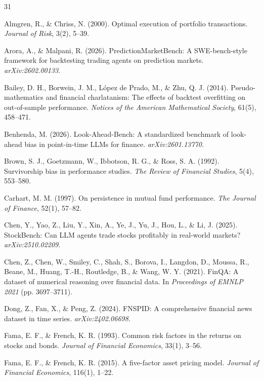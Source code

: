 \documentclass{article}
\begin{document}
\begin{thebibliography}{31}

 Almgren, R., \& Chriss, N. (2000). Optimal execution of portfolio transactions. \textit{Journal of Risk}, 3(2), 5--39.

 Arora, A., \& Malpani, R. (2026). PredictionMarketBench: A SWE-bench-style framework for backtesting trading agents on prediction markets. \textit{arXiv:2602.00133}.

 Bailey, D. H., Borwein, J. M., L\'{o}pez de Prado, M., \& Zhu, Q. J. (2014). Pseudo-mathematics and financial charlatanism: The effects of backtest overfitting on out-of-sample performance. \textit{Notices of the American Mathematical Society}, 61(5), 458--471.

 Benhenda, M. (2026). Look-Ahead-Bench: A standardized benchmark of look-ahead bias in point-in-time LLMs for finance. \textit{arXiv:2601.13770}.

 Brown, S. J., Goetzmann, W., Ibbotson, R. G., \& Ross, S. A. (1992). Survivorship bias in performance studies. \textit{The Review of Financial Studies}, 5(4), 553--580.

 Carhart, M. M. (1997). On persistence in mutual fund performance. \textit{The Journal of Finance}, 52(1), 57--82.

 Chen, Y., Yao, Z., Liu, Y., Xin, A., Ye, J., Yu, J., Hou, L., \& Li, J. (2025). StockBench: Can LLM agents trade stocks profitably in real-world markets? \textit{arXiv:2510.02209}.

 Chen, Z., Chen, W., Smiley, C., Shah, S., Borova, I., Langdon, D., Moussa, R., Beane, M., Huang, T.-H., Routledge, B., \& Wang, W. Y. (2021). FinQA: A dataset of numerical reasoning over financial data. In \textit{Proceedings of EMNLP 2021} (pp. 3697--3711).

 Dong, Z., Fan, X., \& Peng, Z. (2024). FNSPID: A comprehensive financial news dataset in time series. \textit{arXiv:2402.06698}.

 Fama, E. F., \& French, K. R. (1993). Common risk factors in the returns on stocks and bonds. \textit{Journal of Financial Economics}, 33(1), 3--56.

 Fama, E. F., \& French, K. R. (2015). A five-factor asset pricing model. \textit{Journal of Financial Economics}, 116(1), 1--22.


\end{thebibliography}
\end{document}
